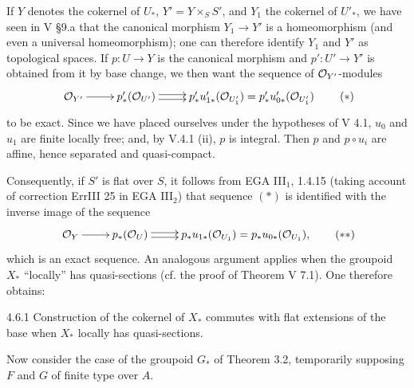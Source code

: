 If $Y$ denotes the cokernel of $U_*$, $Y'=Y\times_SS'$, and $Y_1$ the cokernel of $U'_*$, we have seen in V §9.a that the canonical morphism $Y_1\to Y'$ is a homeomorphism (and even a universal homeomorphism); one can therefore identify $Y_1$ and $Y'$ as topological spaces. If $p:U\to Y$ is the canonical morphism and $p':U'\to Y'$ is obtained from it by base change, we then want the sequence of $\mathcal{O}_{Y'}$-modules
\[
\xymatrix{\OO_{Y'}\ar[r]&p'_*(\OO_{U'})\ar@<.5ex>[r]\ar@<-.5ex>[r]&p'_*u'_{1*}(\OO_{U'_1})=p'_*u'_{0*}(\OO_{U'_1})}\tag{$*$}
\]
to be exact. Since we have placed ourselves under the hypotheses of V 4.1, $u_0$ and $u_1$ are finite locally free; and, by V.4.1 (ii), $p$ is integral. Then $p$ and $p\circ u_i$ are affine, hence separated and quasi-compact.

Consequently, if $S'$ is flat over $S$, it follows from EGA III$_1$, 1.4.15 (taking account of correction ErrIII 25 in EGA III$_2$) that sequence $(*)$ is identified with the inverse image of the sequence
\[
\xymatrix{\OO_Y\ar[r]&p_*(\OO_U)\ar@<.5ex>[r]\ar@<-.5ex>[r]&p_*u_{1*}(\OO_{U_1})=p_*u_{0*}(\OO_{U_1}),}\tag{$**$}
\]
which is an exact sequence. An analogous argument applies when the groupoid $X_*$ ``locally'' has quasi-sections (cf. the proof of Theorem V 7.1). One therefore obtains:
\begin{proposition}{4.6.1}\label{VIA.4.6.1}
Construction of the cokernel of $X_*$ commutes with flat extensions of the base when $X_*$ locally has quasi-sections.
\end{proposition}

Now consider the case of the groupoid $G_*$ of Theorem 3.2, temporarily supposing $F$ and $G$ of finite type over $A$.

